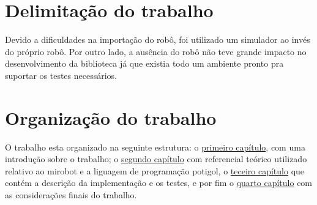 \section{Delimitação do trabalho}

Devido a dificuldades na importação do robô, foi utilizado um simulador ao
invés do próprio robô. Por outro lado, a ausência do robô não teve grande
impacto no desenvolvimento da biblioteca já que existia todo um ambiente pronto
pra suportar os testes necessários.


\section{Organização do trabalho}

O trabalho esta organizado na seguinte estrutura: o
\hyperref[cap:introducao]{primeiro capítulo}, com uma introdução sobre o
trabalho; o \hyperref[cap:referencial]{segundo capítulo} com referencial
teórico utilizado relativo ao mirobot e a liguagem de programação potigol, o
\hyperref[cap:descricao]{teceiro capítulo} que contém a descrição da
implementação e os testes, e por fim o \hyperref[cap:consideracoes]{quarto
capítulo} com as considerações finais do trabalho.
